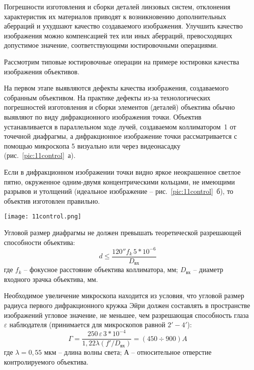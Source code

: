 Погрешности изготовления и сборки деталей линзовых систем, отклонения характеристик их материалов приводят к возникновению дополнительных аберраций и ухудшают качество создаваемого изображения. Улучшить качество изображения можно компенсацией тех или иных аберраций, превосходящих допустимое значение, соответствующими юстировочными операциями.

Рассмотрим типовые юстировочные операции на примере юстировки качества изображения объективов.

На первом этапе выявляются дефекты качества изображения, создаваемого собранным объективом. 
На практике дефекты из-за технологических погрешностей изготовления и сборки элементов (деталей) объектива обычно выявляют по виду дифракционного изображения точки. 
Объектив устанавливается в параллельном ходе лучей, создаваемом коллиматором~1 от точечной диафрагмы, а дифракционное изображение точки рассматривается с помощью микроскопа 5 визуально или через видеонасадку (рис.~\ref{pic:11control}~а).

Если в дифракционном изображении точки видно яркое неокрашенное светлое пятно, окруженное одним-двумя концентрическими кольцами, не имеющими разрывов и утолщений (идеальное изображение -- рис.~\ref{pic:11control}~б), то объектив изготовлен правильно.

\begin{figure*}[h!]
	\caption[Контроль и устранение дефектов качества изображения]{ Контроль и устранение качества изображения }
	\texttt{[image: 11control.png]}
	\label{pic:11control}
\end{figure*}

Угловой размер диафрагмы не должен превышать теоретической разрешающей способности объектива:
\[ d \leq \dfrac{120''f_k\,5*10^{-6}}{D_\text{вх}} \]
где $ f_k $ -- фокусное расстояние объектива коллиматора, мм; $ D_\text{вх} $ -- диаметр входного зрачка объектива, мм.

Необходимое увеличение микроскопа находится из условия, что угловой размер радиуса первого дифракционного кружка Эйри должен составлять в пространстве изображений угловое значение, не меньшее, чем разрешающая способность глаза $ \varepsilon $ наблюдателя (принимается для микроскопов равной $ 2'-4' $):
\[ \Gamma = \dfrac{250 \, \varepsilon\, 3*10^{-4}}{1,22 \lambda (f'/D_\text{вх})} = (450\div900) A \]
где  $ \lambda = 0,55 $ мкм -- длина волны света; А -- относительное отверстие контролируемого объектива.

